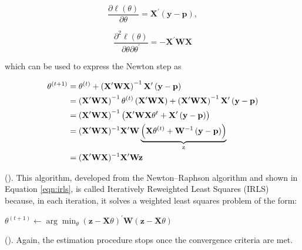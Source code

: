 \begin{equation}
    \frac{\partial \ell(\theta)}{\partial \theta} = \mathbf{X}^\prime \left(\mathbf{y} - \textbf{p}\right),
    \label{eqn:gradient-matrix} 
\end{equation}

\begin{equation}
    \frac{\partial^2 \ell(\theta)}{\partial \theta \partial \theta^\prime}= -\mathbf{X}^\prime \mathbf{W} \mathbf{X}
    \label{eqn:hessian-matrix}
\end{equation}

which can be used to express the Newton step as

\begin{align}
    \theta^{(t+1)} &= \theta^{(t)} + \left( \mathbf{X}^\prime \mathbf{W} \mathbf{X} \right)^{-1} \mathbf{X}^\prime \left( \mathbf{y} - \mathbf{p} \right) \notag \\
    &= \left( \mathbf{X}^\prime \mathbf{W} \mathbf{X} \right)^{-1} \theta^{(t)} \left( \mathbf{X}^\prime \mathbf{W} \mathbf{X} \right) + \left( \mathbf{X}^\prime \mathbf{W} \mathbf{X} \right)^{-1} \mathbf{X}^\prime \left( \mathbf{y} - \mathbf{p} \right) \notag \\
    &= \left( \mathbf{X}^\prime \mathbf{W} \mathbf{X} \right)^{-1} \left( \mathbf{X}^\prime \mathbf{W} \mathbf{X} \theta^{t} + \mathbf{X}^\prime \left( \mathbf{y} - \mathbf{p} \right) \right)\notag \\
    &= (\mathbf{X}^\prime \mathbf{W} \mathbf{X})^{-1} \mathbf{X}^\prime \mathbf{W} \underbrace{\left( \mathbf{X} \theta^{(t)} + \mathbf{W}^{-1} \left( \mathbf{y} - \mathbf{p} \right)\right)}_\textrm{z} \notag \\
    & = (\mathbf{X}^\prime \mathbf{W} \mathbf{X})^{-1} \mathbf{X}^\prime \mathbf{W} \mathbf{z}
    \label{eqn:irls}
\end{align}

(\cite{hastie2009elements}). This algorithm, developed from the Newton–Raphson algorithm and shown in Equation \ref{eqn:irls}, is called Iteratively Reweighted Least Squares (IRLS) because, in each iteration, it solves a weighted least squares problem of the form:

\begin{center}
    $\theta^{(t+1)} \leftarrow \arg \min _\theta(\mathbf{z}-\mathbf{X} \theta)^\prime \mathbf{W}(\mathbf{z}-\mathbf{X} \theta)$
\end{center}

(\cite{hastie2009elements}). Again, the estimation procedure stops once the convergence criteria are met.

